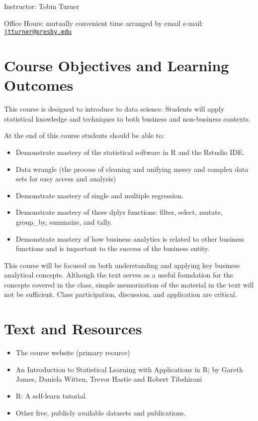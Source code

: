 \documentclass[
]{book}
\providecommand{\tightlist}{%
  \setlength{\itemsep}{0pt}\setlength{\parskip}{0pt}}
\begin{document}
Instructor: Tobin Turner

Office Hours: mutually convenient time arranged by email e-mail: \href{mailto:jtturner@presby.edu}{\nolinkurl{jtturner@presby.edu}}

\hypertarget{course-objectives-and-learning-outcomes}{%
\section{Course Objectives and Learning Outcomes}\label{course-objectives-and-learning-outcomes}}

This course is designed to introduce to data science. Students will apply statistical knowledge and techniques to both business and non-business contexts.

At the end of this course students should be able to:

\begin{itemize}
\tightlist
\item
  Demonstrate mastery of the statistical software in R and the Rstudio IDE.
\item
  Data wrangle (the process of cleaning and unifying messy and complex data sets for easy access and analysis)
\item
  Demonstrate mastery of single and multiple regression.
\item
  Demonstrate mastery of these dplyr functions: filter, select, mutate, group\_by, summaize, and tally.
\item
  Demonstrate mastery of how business analytics is related to other business functions and is important to the success of the business entity.
\end{itemize}

This course will be focused on both understanding and applying key business analytical concepts. Although the text serves as a useful foundation for the concepts covered in the class, simple memorization of the material in the text will not be sufficient. Class participation, discussion, and application are critical.

\hypertarget{text-and-resources}{%
\section{Text and Resources}\label{text-and-resources}}

\begin{itemize}
\tightlist
\item
  The course website (primary reource)
\item
  An Introduction to Statistical Learning with Applications in R; by Gareth James, Daniela Witten, Trevor Hastie and Robert Tibshirani
\item
  R: A self-learn tutorial.
\item
  Other free, publicly available datasets and publications.
\end{itemize}
\end{document}
